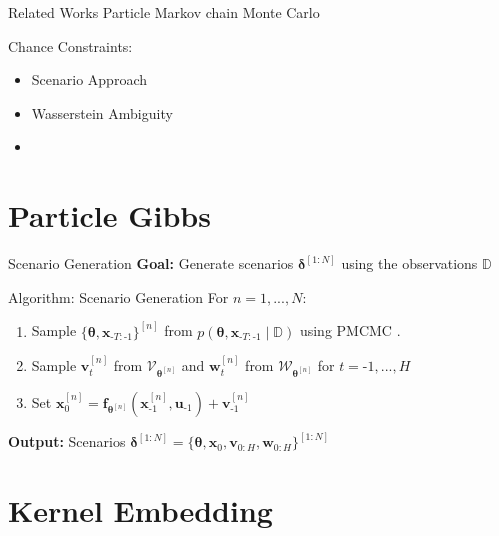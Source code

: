\documentclass[student, noshadow, itr, english, aspectratio=169]{ITR_LSR_slides}
\begin{document}
\begin{frame}{Related Works}
Particle Markov chain Monte Carlo \cite[3]{Andrieu_10}

\vspace{.4cm}

Chance Constraints:
\begin{itemize}
\item Scenario Approach \cite[4]{Robert_24}
\item Wasserstein Ambiguity \cite[4]{Hota_19}
\item {} \cite[4]{Adam_22} \\
\makebox[3cm]{\hfill} \cite[4]{Yassine_22}
\end{itemize}
\end{frame}


\section{Particle Gibbs}

\begin{frame}{Scenario Generation}
\textbf{Goal:} Generate scenarios $\boldsymbol{\delta}^{[1:N]}$ using the observations $\mathbb{D}$\\
\begin{block}{Algorithm: Scenario Generation}
For $n = 1,...,N$:
\begin{enumerate}
  \item Sample $\{ \boldsymbol{\theta}, \boldsymbol{x}_{\text{-}T:\text{-}1} \}^{[n]}$ from $p\left( \boldsymbol{\theta}, \boldsymbol{x}_{\text{-}T:\text{-}1} \mid \mathbb{D} \right)$ using PMCMC \cite{Robert_24}.
  \item Sample $\boldsymbol{v}_t^{[n]}$ from $\boldsymbol{\mathcal{V}}_{\boldsymbol{\theta}^{[n]}}$ and  $\boldsymbol{w}_t^{[n]}$ from $\boldsymbol{\mathcal{W}}_{\boldsymbol{\theta}^{[n]}}$ for $t = \text{-}1, ..., H$
  \item Set $\boldsymbol{x}_0^{[n]} = \boldsymbol{f}_{\boldsymbol{\theta}^{[n]}} \left( \boldsymbol{x}_{\text{-} 1}^{[n]}, \boldsymbol{u}_{\text{-} 1} \right) + \boldsymbol{v}_{\text{-} 1}^{[n]}$
\end{enumerate}
\textbf{Output:} Scenarios $\boldsymbol{\delta}^{[1:N]} = \{ \boldsymbol{\theta}, \boldsymbol{x}_0, \boldsymbol{v}_{0:H}, \boldsymbol{w}_{0:H}\}^{[1:N]}$
\end{block}
\end{frame}


\section{Kernel Embedding}
\end{document}
